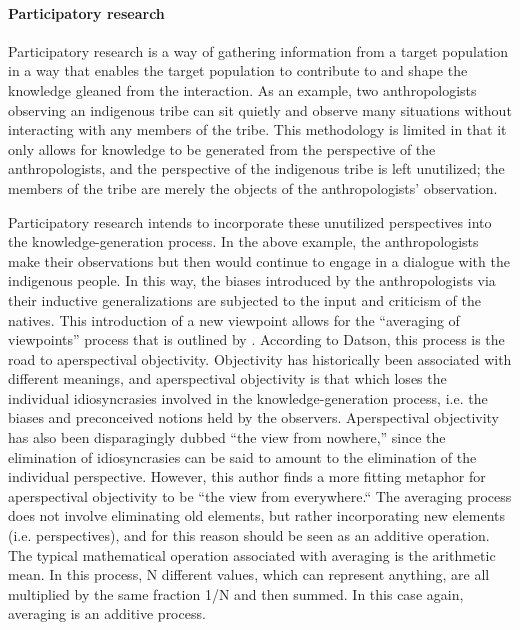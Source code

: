 \documentclass[a4paper]{article}
\begin{document}
\paragraph{Participatory research}
\label{part}

Participatory research is a way of gathering information from a target
population in a way that enables the target population to contribute to and
shape the knowledge gleaned from the interaction. As an example, two
anthropologists observing an indigenous tribe can sit quietly and observe many
situations without interacting with any members of the tribe. This methodology
is limited in that it only allows for knowledge to be generated from the
perspective of the anthropologists, and the perspective of the indigenous
tribe is left unutilized; the members of the tribe are merely the objects of
the anthropologists' observation. 

Participatory research intends to incorporate these unutilized perspectives
into the knowledge-generation process. In the above example, the
anthropologists make their observations but then would continue to engage in a
dialogue with the indigenous people. In this way, the biases introduced by the
anthropologists via their inductive generalizations are subjected to the input
and criticism of the natives. This introduction of a new viewpoint allows for
the ``averaging of viewpoints'' process that is outlined by
\cite{datson1992objectivity}. According to Datson, this process is the road to
aperspectival objectivity. Objectivity has historically been associated with
different meanings, and aperspectival objectivity is that which
loses the individual idiosyncrasies involved in the knowledge-generation
process, i.e. the biases and preconceived notions held by the observers.
Aperspectival objectivity has also been disparagingly dubbed ``the view from
nowhere,'' since the elimination of idiosyncrasies can be said to amount to
the elimination of the individual perspective. However, this author finds a
more fitting metaphor for aperspectival objectivity to be ``the view from
everywhere.`` The averaging process does not involve eliminating old elements,
but rather incorporating new elements (i.e.  perspectives), and for this
reason should be seen as an additive operation.  The typical mathematical
operation associated with averaging is the arithmetic mean. In this process, N
different values, which can represent anything, are all multiplied by the same
fraction 1/N and then summed. In this case again, averaging is an additive
process.
\end{document}
